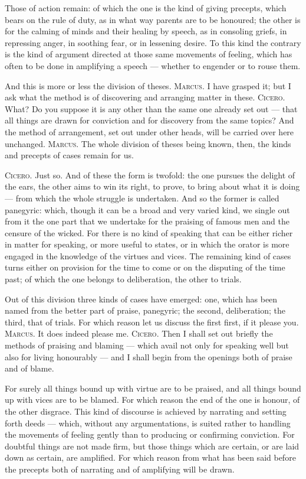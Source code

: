  Those of action remain: of which the one is the kind of giving precepts, which bears on the rule of duty, as in what way parents are to be honoured; the other is for the calming of minds and their healing by speech, as in consoling griefs, in repressing anger, in soothing fear, or in lessening desire. To this kind the contrary is the kind of argument directed at those same movements of feeling, which has often to be done in amplifying a speech — whether to engender or to rouse them.

 And this is more or less the division of theses. \textsc{Marcus.} I have grasped it; but I ask what the method is of discovering and arranging matter in these. \textsc{Cicero.} What? Do you suppose it is any other than the same one already set out — that all things are drawn for conviction and for discovery from the same topics? And the method of arrangement, set out under other heads, will be carried over here unchanged. \textsc{Marcus.} The whole division of theses being known, then, the kinds and precepts of cases remain for us.

 \textsc{Cicero.} Just so. And of these the form is twofold: the one pursues the delight of the ears, the other aims to win its right, to prove, to bring about what it is doing — from which the whole struggle is undertaken. And so the former is called panegyric: which, though it can be a broad and very varied kind, we single out from it the one part that we undertake for the praising of famous men and the censure of the wicked. For there is no kind of speaking that can be either richer in matter for speaking, or more useful to states, or in which the orator is more engaged in the knowledge of the virtues and vices. The remaining kind of cases turns either on provision for the time to come or on the disputing of the time past; of which the one belongs to deliberation, the other to trials.

 Out of this division three kinds of cases have emerged: one, which has been named from the better part of praise, panegyric; the second, deliberation; the third, that of trials. For which reason let us discuss the first first, if it please you. \textsc{Marcus.} It does indeed please me. \textsc{Cicero.} Then I shall set out briefly the methods of praising and blaming — which avail not only for speaking well but also for living honourably — and I shall begin from the openings both of praise and of blame.

 For surely all things bound up with virtue are to be praised, and all things bound up with vices are to be blamed. For which reason the end of the one is honour, of the other disgrace. This kind of discourse is achieved by narrating and setting forth deeds — which, without any argumentations, is suited rather to handling the movements of feeling gently than to producing or confirming conviction. For doubtful things are not made firm, but those things which are certain, or are laid down as certain, are amplified. For which reason from what has been said before the precepts both of narrating and of amplifying will be drawn.

